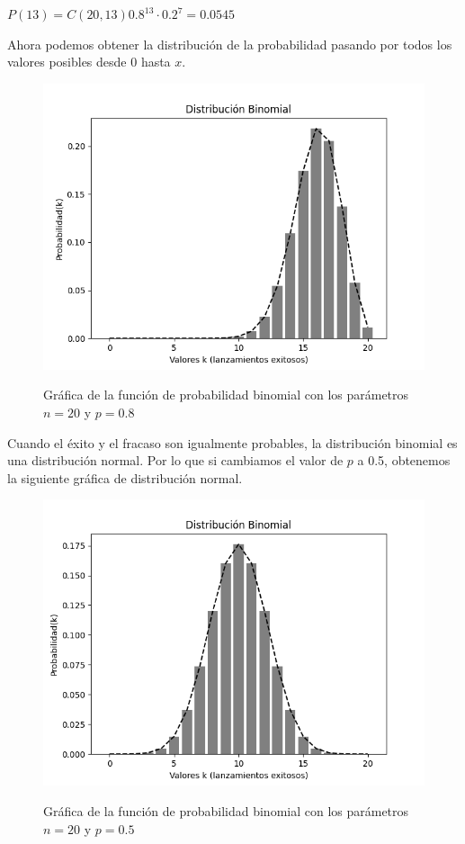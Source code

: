 $P(13) = C(20,13) 0.8^{13} \cdot 0.2^{7} = 0.0545$

Ahora podemos obtener la distribución de la probabilidad pasando por todos los
valores posibles desde 0 hasta $x$.

\begin{figure}[h!]
\includegraphics[scale=0.9]{../slides/figures/binomial_distribution.png}
\label{fig:binomial_distribution}
\caption{Gráfica de la función de probabilidad binomial con los parámetros $n=20$ y $p=0.8$}
\end{figure}

Cuando el éxito y el fracaso son igualmente probables, la distribución binomial
es una distribución normal. Por lo que si cambiamos el valor de $p$ a 0.5,
obtenemos la siguiente gráfica de distribución normal.

\begin{figure}[h!]
    \includegraphics[scale=0.9]{../slides/figures/binomial_distribution_normal.png}
    \label{fig:normal_binomial_distribution}
    \caption{Gráfica de la función de probabilidad binomial con los parámetros $n=20$ y $p=0.5$}
\end{figure}
